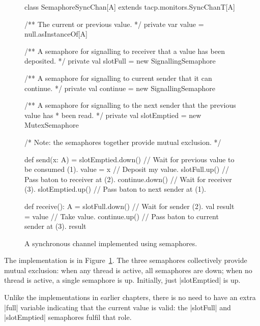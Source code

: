 \begin{figure}
\begin{scala}
class SemaphoreSyncChan[A] extends tacp.monitors.SyncChanT[A]{  
  /** The current or previous value. */
  private var value = null.asInstanceOf[A]

  /** A semaphore for signalling to receiver that a value has been deposited. */
  private val slotFull = new SignallingSemaphore

  /** A semaphore for signalling to current sender that it can continue. */
  private val continue = new SignallingSemaphore

  /** A semaphore for signalling to the next sender that the previous value has
    * been read. */
  private val slotEmptied = new MutexSemaphore

  /* Note: the semaphores together provide mutual exclusion. */

  def send(x: A) = {
    slotEmptied.down()      // Wait for previous value to be consumed (1).
    value = x               // Deposit my value.
    slotFull.up()           // Pass baton to receiver at (2).
    continue.down()         // Wait for receiver (3).
    slotEmptied.up()        // Pass baton to next sender at (1).
  }

  def receive(): A = {
    slotFull.down()         // Wait for sender (2).
    val result = value      // Take value.
    continue.up()           // Pass baton to current sender at (3).
    result
  }
}
\end{scala}
\caption{A synchronous channel implemented using semaphores.}
\label{fig:SemaphoreSyncChan}
\end{figure}


The implementation is in Figure~\ref{fig:SemaphoreSyncChan}.
The three semaphores collectively provide mutual exclusion: when any
thread is active, all semaphores are down; when no thread is active, a
single semaphore is up.  Initially, just |slotEmptied| is up.

Unlike the implementations in earlier chapters, there is no need to have an
extra |full| variable indicating that the current value is valid: the
|slotFull| and |slotEmptied| semaphores fulfil that role.



